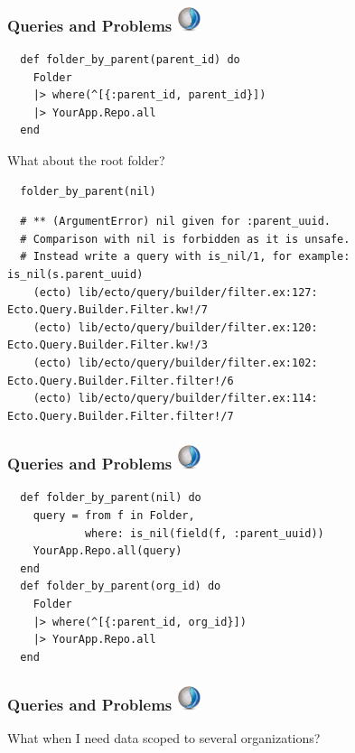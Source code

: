 \documentclass{beamer}
\begin{document}
\begin{frame}[fragile]
\frametitle{Queries and Problems \hfill \includegraphics[width=0.05\textwidth]{recogizer_logo_small.png}}
\begin{verbatim}
  def folder_by_parent(parent_id) do
    Folder
    |> where(^[{:parent_id, parent_id}])
    |> YourApp.Repo.all
  end
\end{verbatim}
\pause
\centerline{What about the root folder?}
\begin{verbatim}
  folder_by_parent(nil)
\end{verbatim}
\pause
\begin{tiny}
\begin{verbatim}
  # ** (ArgumentError) nil given for :parent_uuid.
  # Comparison with nil is forbidden as it is unsafe.
  # Instead write a query with is_nil/1, for example: is_nil(s.parent_uuid)
    (ecto) lib/ecto/query/builder/filter.ex:127: Ecto.Query.Builder.Filter.kw!/7
    (ecto) lib/ecto/query/builder/filter.ex:120: Ecto.Query.Builder.Filter.kw!/3
    (ecto) lib/ecto/query/builder/filter.ex:102: Ecto.Query.Builder.Filter.filter!/6
    (ecto) lib/ecto/query/builder/filter.ex:114: Ecto.Query.Builder.Filter.filter!/7

\end{verbatim}
\end{tiny}
\end{frame}


\begin{frame}[fragile]
\frametitle{Queries and Problems \hfill \includegraphics[width=0.05\textwidth]{recogizer_logo_small.png}}
\begin{verbatim}
  def folder_by_parent(nil) do
    query = from f in Folder,
            where: is_nil(field(f, :parent_uuid))
    YourApp.Repo.all(query)
  end
  def folder_by_parent(org_id) do
    Folder
    |> where(^[{:parent_id, org_id}])
    |> YourApp.Repo.all
  end
\end{verbatim}
\end{frame}


\begin{frame}[fragile]
\frametitle{Queries and Problems \hfill \includegraphics[width=0.05\textwidth]{recogizer_logo_small.png}}
\centerline{What when I need data scoped to several organizations?}
\end{frame}
\end{document}
